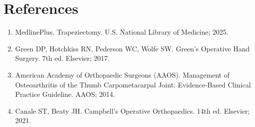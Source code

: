 \section*{References}
\begin{enumerate}
  \item MedlinePlus. Trapeziectomy. U.S. National Library of Medicine; 2025.
  \item Green DP, Hotchkiss RN, Pederson WC, Wolfe SW. Green's Operative Hand Surgery. 7th ed. Elsevier; 2017.
  \item American Academy of Orthopaedic Surgeons (AAOS). Management of Osteoarthritis of the Thumb Carpometacarpal Joint: Evidence-Based Clinical Practice Guideline. AAOS; 2014.
  \item Canale ST, Beaty JH. Campbell's Operative Orthopaedics. 14th ed. Elsevier; 2021.
\end{enumerate}

\clearpage
